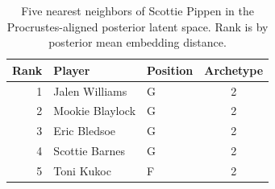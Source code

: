 \begin{table}[htbp]
  \centering\small
  \begin{tabular}{rllc}
    \toprule
    Rank & Player & Position & Archetype \\
    \midrule
    1 & Jalen Williams & G & 2 \\
    2 & Mookie Blaylock & G & 2 \\
    3 & Eric Bledsoe & G & 2 \\
    4 & Scottie Barnes & G & 2 \\
    5 & Toni Kukoc & F & 2 \\
    \bottomrule
  \end{tabular}
  \caption{Five nearest neighbors of Scottie Pippen in the Procrustes-aligned posterior latent space. Rank is by posterior mean embedding distance.}
\end{table}

